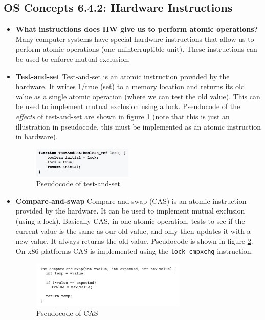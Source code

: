 \documentclass[12pt]{article}
\begin{document}
\subsection*{OS Concepts 6.4.2: Hardware Instructions}

\begin{itemize}
    \item \textbf{What instructions does HW give us to perform atomic operations?} Many computer systems have special hardware instructions that allow us to perform atomic operations (one uninterruptible unit). These instructions can be used to enforce mutual exclusion.
    \item \textbf{Test-and-set} Test-and-set is an atomic instruction provided by the hardware. It writes 1/true (set) to a memory location and returns its old value as a single atomic operation (where we can test the old value). This can be used to implement mutual exclusion using a lock. Pseudocode of the \textit{effects} of test-and-set are shown in figure \ref{fig:test-and-set} (note that this is just an illustration in pseudocode, this must be implemented as an atomic instruction in hardware).
    \begin{figure}[ht]
        \centering
        \includegraphics[width=0.45\textwidth]{figures/test-and-set.jpg}
        \caption{Pseudocode of test-and-set}
        \label{fig:test-and-set}
    \end{figure}
\item \textbf{Compare-and-swap} Compare-and-swap (CAS) is an atomic instruction provided by the hardware. It can be used to implement mutual exclusion (using a lock). Basically CAS, in one atomic operation, tests to see if the current value is the same as our old value, and only then updates it with a new value. It always returns the old value. Pseudocode is shown in figure \ref{fig:cas}. On x86 platforms CAS is implemented using the \texttt{lock cmpxchg} instruction.
    \begin{figure}[ht]
        \centering
        \includegraphics[width=0.7\textwidth]{figures/cas.jpg}
        \caption{Pseudocode of CAS}
        \label{fig:cas}
    \end{figure}
\end{itemize}
\end{document}
